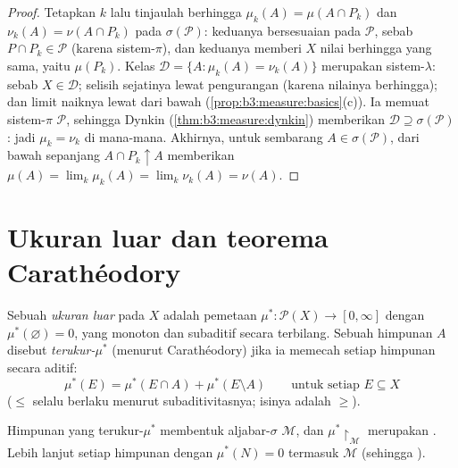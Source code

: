 \begin{proof}
Tetapkan $k$ lalu tinjaulah  berhingga $\mu_k(A) = \mu(A \cap
P_k)$ dan $\nu_k(A) = \nu(A \cap P_k)$ pada $\sigma(\mathcal
P)$: keduanya bersesuaian pada $\mathcal P$, sebab $P \cap P_k \in \mathcal
P$ (karena sistem-$\pi$), dan keduanya memberi $X$ nilai berhingga yang sama, yaitu
$\mu(P_k)$. Kelas $\mathcal D = \{A : \mu_k(A) =
\nu_k(A)\}$ merupakan sistem-$\lambda$: sebab $X \in \mathcal D$; selisih
sejatinya lewat pengurangan (karena nilainya berhingga); dan limit naiknya
lewat  dari bawah (\cref{prop:b3:measure:basics}(c)).
Ia memuat sistem-$\pi$ $\mathcal P$, sehingga Dynkin
(\cref{thm:b3:measure:dynkin}) memberikan $\mathcal D \supseteq
\sigma(\mathcal P)$: jadi $\mu_k = \nu_k$ di mana-mana. Akhirnya, untuk
sembarang $A \in \sigma(\mathcal P)$,  dari bawah sepanjang $A
\cap P_k \uparrow A$ memberikan $\mu(A) = \lim_k\mu_k(A) =
\lim_k\nu_k(A) = \nu(A)$.
\end{proof}

\section{Ukuran luar dan teorema Carathéodory}

\begin{definition}\label{def:b3:measure:outer}
Sebuah \emph{ukuran luar} pada $X$ adalah pemetaan
$\mu^* \colon \mathcal P(X) \to [0, \infty]$ dengan
$\mu^*(\varnothing) = 0$, yang monoton dan subaditif secara terbilang.
Sebuah himpunan $A$ disebut \emph{terukur-$\mu^*$} (menurut Carathéodory) jika
ia memecah setiap himpunan secara aditif:
\[
\mu^*(E) = \mu^*(E \cap A) + \mu^*(E \setminus A)
\qquad \text{untuk setiap } E \subseteq X
\]
($\leq$ selalu berlaku menurut subaditivitasnya; isinya adalah $\geq$).
\end{definition}

\begin{theorem}[Carathéodory]\label{thm:b3:measure:caratheodory}
Himpunan yang terukur-$\mu^*$ membentuk aljabar-$\sigma$ $\mathcal
M$, dan $\mu^*\restriction_{\mathcal M}$ merupakan .
Lebih lanjut setiap himpunan dengan $\mu^*(N) = 0$ termasuk $\mathcal M$
(sehingga  \emph{}).
\end{theorem}

